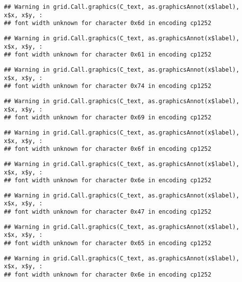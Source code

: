 \documentclass[
]{article}
\begin{document}
\begin{verbatim}
## Warning in grid.Call.graphics(C_text, as.graphicsAnnot(x$label), x$x, x$y, :
## font width unknown for character 0x6d in encoding cp1252
\end{verbatim}

\begin{verbatim}
## Warning in grid.Call.graphics(C_text, as.graphicsAnnot(x$label), x$x, x$y, :
## font width unknown for character 0x61 in encoding cp1252
\end{verbatim}

\begin{verbatim}
## Warning in grid.Call.graphics(C_text, as.graphicsAnnot(x$label), x$x, x$y, :
## font width unknown for character 0x74 in encoding cp1252
\end{verbatim}

\begin{verbatim}
## Warning in grid.Call.graphics(C_text, as.graphicsAnnot(x$label), x$x, x$y, :
## font width unknown for character 0x69 in encoding cp1252
\end{verbatim}

\begin{verbatim}
## Warning in grid.Call.graphics(C_text, as.graphicsAnnot(x$label), x$x, x$y, :
## font width unknown for character 0x6f in encoding cp1252
\end{verbatim}

\begin{verbatim}
## Warning in grid.Call.graphics(C_text, as.graphicsAnnot(x$label), x$x, x$y, :
## font width unknown for character 0x6e in encoding cp1252
\end{verbatim}

\begin{verbatim}
## Warning in grid.Call.graphics(C_text, as.graphicsAnnot(x$label), x$x, x$y, :
## font width unknown for character 0x47 in encoding cp1252
\end{verbatim}

\begin{verbatim}
## Warning in grid.Call.graphics(C_text, as.graphicsAnnot(x$label), x$x, x$y, :
## font width unknown for character 0x65 in encoding cp1252
\end{verbatim}

\begin{verbatim}
## Warning in grid.Call.graphics(C_text, as.graphicsAnnot(x$label), x$x, x$y, :
## font width unknown for character 0x6e in encoding cp1252
\end{verbatim}
\end{document}
